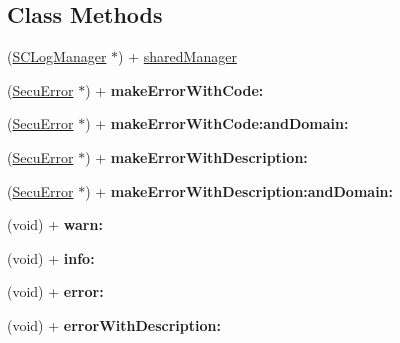 \subsection*{Class Methods}
\begin{DoxyCompactItemize}
\item 
(\hyperlink{interface_s_c_log_manager}{S\+C\+Log\+Manager} $\ast$) + \hyperlink{interface_s_c_log_manager_aa1a4662ee44ab6d428166539ed817d16}{shared\+Manager}
\item 
(\hyperlink{interface_secu_error}{Secu\+Error} $\ast$) + {\bfseries make\+Error\+With\+Code\+:}\hypertarget{interface_s_c_log_manager_a8c9421ca30e53df3745b9e2deb750294}{}\label{interface_s_c_log_manager_a8c9421ca30e53df3745b9e2deb750294}

\item 
(\hyperlink{interface_secu_error}{Secu\+Error} $\ast$) + {\bfseries make\+Error\+With\+Code\+:and\+Domain\+:}\hypertarget{interface_s_c_log_manager_a96f011a8273dceab1d6bd317cbe595b2}{}\label{interface_s_c_log_manager_a96f011a8273dceab1d6bd317cbe595b2}

\item 
(\hyperlink{interface_secu_error}{Secu\+Error} $\ast$) + {\bfseries make\+Error\+With\+Description\+:}\hypertarget{interface_s_c_log_manager_a716be96a1e169bd4aeb33771ef4342b0}{}\label{interface_s_c_log_manager_a716be96a1e169bd4aeb33771ef4342b0}

\item 
(\hyperlink{interface_secu_error}{Secu\+Error} $\ast$) + {\bfseries make\+Error\+With\+Description\+:and\+Domain\+:}\hypertarget{interface_s_c_log_manager_a8cd549a7ad4bb94c5be9459722ac64aa}{}\label{interface_s_c_log_manager_a8cd549a7ad4bb94c5be9459722ac64aa}

\item 
(void) + {\bfseries warn\+:}\hypertarget{interface_s_c_log_manager_a173c6800c91f287f7a3114657c4c3a0e}{}\label{interface_s_c_log_manager_a173c6800c91f287f7a3114657c4c3a0e}

\item 
(void) + {\bfseries info\+:}\hypertarget{interface_s_c_log_manager_af0ef57c0cc32127e242672afc5fec6f6}{}\label{interface_s_c_log_manager_af0ef57c0cc32127e242672afc5fec6f6}

\item 
(void) + {\bfseries error\+:}\hypertarget{interface_s_c_log_manager_a0d40a1923f0bacb1fbb6460ebf851fe6}{}\label{interface_s_c_log_manager_a0d40a1923f0bacb1fbb6460ebf851fe6}

\item 
(void) + {\bfseries error\+With\+Description\+:}\hypertarget{interface_s_c_log_manager_a5741cfa90412d03f3ac81fb034df9e53}{}\label{interface_s_c_log_manager_a5741cfa90412d03f3ac81fb034df9e53}

\end{DoxyCompactItemize}
